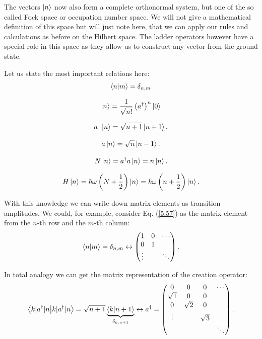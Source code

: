 The vectors $\ket{n}$ now also form a complete orthonormal system, but one of the so called Fock space or occupation number space. We will not give a mathematical definition of this space but will just note here, that we can apply our rules and calculations as before on the Hilbert space. The ladder operators however have a special role in this space as they allow us to construct any vector from the ground state.

Let us state the most important relations here:
\begin{equation}
	\braket{n}{m} = \delta_{n,m} \label{5.57}
\end{equation}

\begin{equation}
	\ket{n}=\frac{1}{\sqrt{n !}}\left(a^{\dagger}\right)^{n}\ket{0} \label{5.58}
\end{equation}

\begin{equation}
	a^{\dagger}\ket{n}=\sqrt{n+1}\ket{n+1}.
\end{equation}

\begin{equation}
	a\ket{n}=\sqrt{n}\ket{n-1}.
\end{equation}

\begin{equation}
	N\ket{n}=a^{\dagger}a\ket{n}=n\ket{n}.
\end{equation}

\begin{equation}
	H\ket{n}=\hbar\omega\left(N+\frac{1}{2}\right)\ket{n}=\hbar\omega\left(n+\frac{1}{2}\right)\ket{n}.
\end{equation}

With this knowledge we can write down matrix elements as transition amplitudes. We could, for example, consider Eq. (\ref{5.57}) as the matrix element from the $n$-th row and the $m$-th column:
\begin{equation}
	\braket{n}{m} = \delta_{n,m} \leftrightarrow\begin{pmatrix} 1 & 0 & \cdots \\ 0 & 1 & \\ \vdots & & \ddots \end{pmatrix} .
\end{equation}

In total analogy we can get the matrix representation of the creation operator:
\begin{equation}
	\braket{k|a^\dagger|n}=\sqrt{n+1} \underbrace{\braket{k}{n+1}}_{\delta_{k,n+1}} \leftrightarrow a^{\dagger}=\begin{pmatrix} 0 & 0 & 0 & \cdots \\ \sqrt{1} & 0 & 0 & \\ 0 & \sqrt{2} & 0 & \\ \vdots & & \sqrt{3} & \\ & & & \ddots \end{pmatrix}.
\end{equation}

